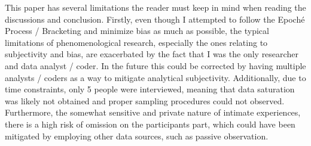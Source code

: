 
This paper has several limitations the reader must keep in mind when reading the discussions and conclusion.
Firstly, even though I attempted to follow the Epoché Process / Bracketing and minimize bias as much as possible, the typical limitations of phenomenological research, especially the ones relating to subjectivity and bias, are exacerbated by the fact that I was the only researcher and data analyst / coder.
In the future this could be corrected by having multiple analysts / coders as a way to mitigate analytical subjectivity.
Additionally, due to time constraints, only 5 people were interviewed, meaning that data saturation was likely not obtained and proper sampling procedures could not observed.
Furthermore, the somewhat sensitive and private nature of intimate experiences, there is a high risk of omission on the participants part, which could have been mitigated by employing other data sources, such as passive observation.